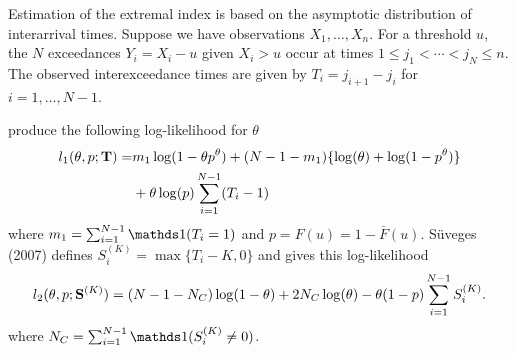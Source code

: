 Estimation of the extremal index is based on the asymptotic distribution of interarrival times. Suppose we have observations $X_1,\ldots,X_n$. For a threshold $u$, the $N$ exceedances $Y_i=X_i-u$ given $X_i>u$ occur at times $1\leq j_1<\cdots< j_N\leq n$. The observed interexceedance times are given by $T_i=j_{i+1}-j_i$ for $i=1,\ldots,N-1$.

\cite{ferro2003inference} produce the following log-likelihood for $\theta$
\begin{align}
l_1(\theta, p; \mathbf{\bm{T}}) =& m_1\log(1-\theta p^\theta) + (N-1-m_1)\{\log(\theta)+ \log(1-p^\theta)\} \nonumber \\
 &+ \theta\log(p)\sum_{i=1}^{N-1}(T_i-1) \label{ferro}
\end{align}
where $m_1=\sum_{i=1}^{N-1}\ind(T_i=1)$ and $p=F(u)=1-\overline{F}(u)$. S{\"u}veges (2007) defines $S_i^{(K)}=\max\{T_i-K,0\}$ and gives this log-likelihood
\begin{align}
l_2(\theta, p; \mathbf{\bm{S}}^{(K)})= (N-1-N_C)\log(1-\theta)+2N_C\log(\theta)-\theta (1-p) \sum_{i=1}^{N-1}S_i^{(K)}. \label{suveges}
\end{align}
where $N_C=\sum_{i=1}^{N-1}\ind(S_i^{(K)} \neq 0)$. 
